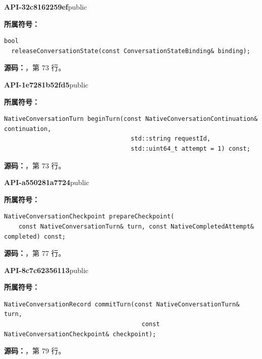 \textbf{API-32c8162259ef}\quad public\par
\textbf{所属符号：}\par
\begin{Verbatim}[fontsize=\footnotesize,breaklines,breakanywhere]
bool
  releaseConversationState(const ConversationStateBinding& binding);
\end{Verbatim}
\textbf{源码：}，第 73 行。\par

\textbf{API-1e7281b52fd5}\quad public\par
\textbf{所属符号：}\par
\begin{Verbatim}[fontsize=\footnotesize,breaklines,breakanywhere]
NativeConversationTurn beginTurn(const NativeConversationContinuation& continuation,
                                   std::string requestId,
                                   std::uint64_t attempt = 1) const;
\end{Verbatim}
\textbf{源码：}，第 73 行。\par

\textbf{API-a550281a7724}\quad public\par
\textbf{所属符号：}\par
\begin{Verbatim}[fontsize=\footnotesize,breaklines,breakanywhere]
NativeConversationCheckpoint prepareCheckpoint(
    const NativeConversationTurn& turn, const NativeCompletedAttempt& completed) const;
\end{Verbatim}
\textbf{源码：}，第 77 行。\par

\textbf{API-8c7c62356113}\quad public\par
\textbf{所属符号：}\par
\begin{Verbatim}[fontsize=\footnotesize,breaklines,breakanywhere]
NativeConversationRecord commitTurn(const NativeConversationTurn& turn,
                                      const NativeConversationCheckpoint& checkpoint);
\end{Verbatim}
\textbf{源码：}，第 79 行。\par

